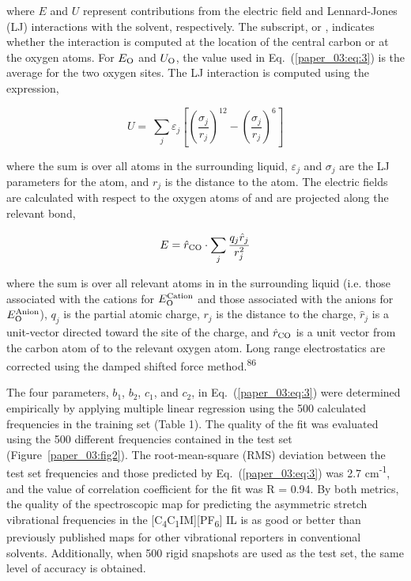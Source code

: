 \documentclass[]{article}
\begin{document}
where \(E\) and \(U\) represent contributions from the electric field and Lennard-Jones (LJ) interactions with the solvent, respectively. The subscript,  or , indicates whether the interaction is computed at the location of the  central carbon or at the oxygen atoms. For \(E_{\ce{O}}\) and \(U_{\ce{O}}\), the value used in Eq.~(\ref{paper_03:eq:3}) is the average for the two  oxygen sites. The LJ interaction is computed using the expression,

\begin{equation}
  \label{paper_03:eq:4}
  U = \ \sum_{j}^{}\varepsilon_{j}\left\lbrack \left( \frac{\sigma_{j}}{r_{j}} \right)^{12} - \left( \frac{\sigma_{j}}{r_{j}} \right)^{6} \right\rbrack
\end{equation}

where the sum is over all atoms in the surrounding liquid, \(\varepsilon_{j}\) and \(\sigma_{j}\) are the LJ parameters for the atom, and \(r_{j}\) is the distance to the atom. The electric fields are calculated with respect to the oxygen atoms of  and are projected along the relevant  bond,

\begin{equation}
  \label{paper_03:eq:5}
  E = {\hat{r}}_{\ce{CO}} \cdot \sum_{j}^{}\frac{q_{j}{\hat{r}}_{j}}{r_{j}^{2}}
\end{equation}

where the sum is over all relevant atoms in in the surrounding liquid (i.e. those associated with the cations for \(E_{\ce{O}}^{\text{Cation}}\) and those associated with the anions for \(E_{\ce{O}}^{\text{Anion}}\)), \(q_{j}\) is the partial atomic charge, \(r_{j}\) is the distance to the charge, \({\hat{r}}_{j}\) is a unit-vector directed toward the site of the charge, and \({\hat{r}}_{\ce{CO}}\) is a unit vector from the carbon atom of  to the relevant oxygen atom. Long range electrostatics are corrected using the damped shifted force method.\textsuperscript{86}

The four parameters, \(b_{1}\), \(b_{2}\), \(c_{1}\), and \(c_{2}\), in Eq.~(\ref{paper_03:eq:3}) were determined empirically by applying multiple linear regression using the 500 calculated frequencies in the training set (Table 1). The quality of the fit was evaluated using the 500 different frequencies contained in the test set (Figure~\ref{paper_03:fig2}). The root-mean-square (RMS) deviation between the test set frequencies and those predicted by Eq.~(\ref{paper_03:eq:3}) was 2.7 cm\textsuperscript{-1}, and the value of correlation coefficient for the fit was R = 0.94. By both metrics, the quality of the spectroscopic map for predicting the  asymmetric stretch vibrational frequencies in the {[}C\textsubscript{4}C\textsubscript{1}IM{]}{[}PF\textsubscript{6}{]} IL is as good or better than previously published maps for other vibrational reporters in conventional solvents. Additionally, when 500 rigid  snapshots are used as the test set, the same level of accuracy is obtained.
\end{document}
